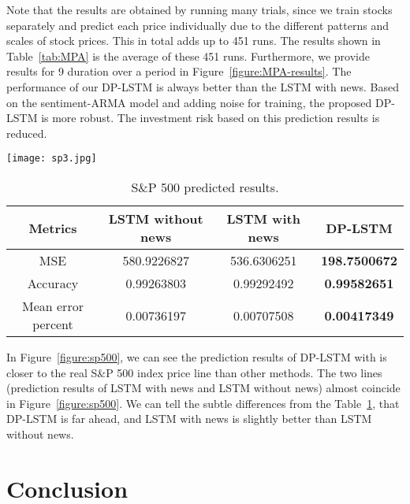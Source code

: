 \documentclass{article}
\begin{document}
Note that the results are obtained by running many trials, since we train stocks separately and predict each price individually due to the different patterns and scales of stock prices. This in total adds up to 451 runs. The results shown in Table~\ref{tab:MPA} is the average of these 451 runs. Furthermore, we provide results for 9 duration over a period in Figure~\ref{figure:MPA-results}. The performance of our DP-LSTM is always better than the LSTM with news. Based on the sentiment-ARMA model and adding noise for training, the proposed DP-LSTM is more robust. The investment risk based on this prediction results is reduced.





\begin{figure*}[!htb]
	\centering
	{\texttt{[image: sp3.jpg]}}
	\caption{Prediction result of LSTM based on price.}
	\label{figure:sp500}
\end{figure*}



\begin{table}
\centering
\begin{tabular}{cccc}  
\toprule
Metrics  & LSTM without news & LSTM with news & \textbf{DP-LSTM}\\
\midrule
MSE    & 580.9226827 & 536.6306251 & \textbf{198.7500672}  \\
Accuracy     &  0.99263803 & 0.99292492 & \textbf{0.99582651} \\
Mean error percent     &  0.00736197 & 0.00707508 & \textbf{0.00417349} \\
\bottomrule
\end{tabular}
\caption{S\&P 500 predicted results.}
\label{tab:sp}
\end{table}

In Figure~\ref{figure:sp500}, we can see the prediction results of DP-LSTM with is closer to the real S\&P 500 index price line than other methods. The two lines (prediction results of LSTM with news and LSTM without news) almost coincide in Figure~\ref{figure:sp500}. We can tell the subtle differences from the Table~\ref{tab:sp}, that DP-LSTM is far ahead, and LSTM with news is slightly better than LSTM without news.



\section{Conclusion}
\end{document}
